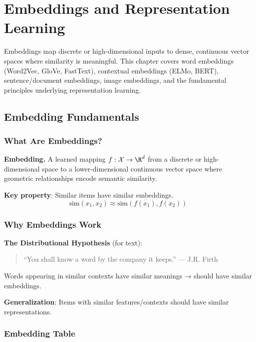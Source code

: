 \chapter{Embeddings and Representation Learning}
\label{chap:embeddings}

\begin{tldr}
Embeddings map discrete or high-dimensional inputs to dense, continuous vector spaces where similarity is meaningful. This chapter covers word embeddings (Word2Vec, GloVe, FastText), contextual embeddings (ELMo, BERT), sentence/document embeddings, image embeddings, and the fundamental principles underlying representation learning.
\end{tldr}

\section{Embedding Fundamentals}
\label{sec:embedding_fundamentals}

\subsection{What Are Embeddings?}

\textbf{Embedding.} A learned mapping $f: \mathcal{X} \to \R^d$ from a discrete or high-dimensional space to a lower-dimensional continuous vector space where geometric relationships encode semantic similarity.

\textbf{Key property}: Similar items have similar embeddings.
\begin{equation}
\text{sim}(x_1, x_2) \approx \text{sim}(f(x_1), f(x_2))
\end{equation}

\subsection{Why Embeddings Work}

\textbf{The Distributional Hypothesis} (for text):
\begin{quote}
``You shall know a word by the company it keeps.'' — J.R. Firth
\end{quote}

Words appearing in similar contexts have similar meanings → should have similar embeddings.

\textbf{Generalization}: Items with similar features/contexts should have similar representations.

\subsection{Embedding Table}

